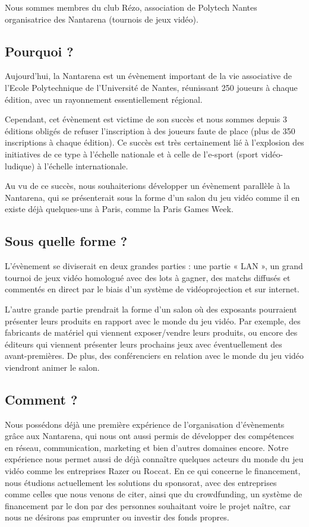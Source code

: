 \documentclass[french]{article}
\begin{document}
Nous sommes membres du club Rézo, association de Polytech Nantes organisatrice des Nantarena (tournois de jeux vidéo).

\subsection{Pourquoi ?}

Aujourd'hui, la Nantarena est un évènement important de la vie associative de l'Ecole Polytechnique de l'Université de Nantes, réunissant 250 joueurs à chaque édition, avec un rayonnement essentiellement régional.

Cependant, cet évènement est victime de son succès et nous sommes depuis 3 éditions obligés de refuser l'inscription à des joueurs faute de place (plus de 350 inscriptions à chaque édition).
Ce succès est très certainement lié à l'explosion des initiatives de ce type à l'échelle nationale et à celle de l'e-sport (sport vidéo-ludique) à l'échelle internationale.

Au vu de ce succès, nous souhaiterions développer un évènement parallèle à la Nantarena, qui se présenterait sous la forme d'un salon du jeu vidéo comme il en existe déjà quelques-uns à Paris, comme la Paris Games Week.

\subsection{Sous quelle forme ?}

L'évènement se diviserait en deux grandes parties : une partie « LAN », un grand tournoi de jeux vidéo homologué avec des lots à gagner, des matchs diffusés et commentés en direct par le biais d'un système de vidéoprojection et sur internet.

L'autre grande partie prendrait la forme d'un salon où des exposants pourraient présenter leurs produits en rapport avec le monde du jeu vidéo. Par exemple, des fabricants de matériel qui viennent exposer/vendre leurs produits, ou encore des éditeurs qui viennent présenter leurs prochains jeux avec éventuellement des avant-premières. De plus, des conférenciers en relation avec le monde du jeu vidéo viendront animer le salon.

\subsection{Comment ?}

Nous possédons déjà une première expérience de l'organisation d'évènements grâce aux Nantarena, qui nous ont aussi permis de développer des compétences en réseau, communication, marketing et bien d'autres domaines encore.
Notre expérience nous permet aussi de  déjà connaître quelques acteurs du monde du jeu vidéo comme les entreprises Razer ou Roccat.
En ce qui concerne le financement, nous étudions actuellement les solutions du sponsorat, avec des entreprises comme celles que nous venons de citer, ainsi que du crowdfunding, un système de financement par le don par des personnes souhaitant voire le projet naître, car nous ne désirons pas emprunter ou investir des fonds propres.
\end{document}
